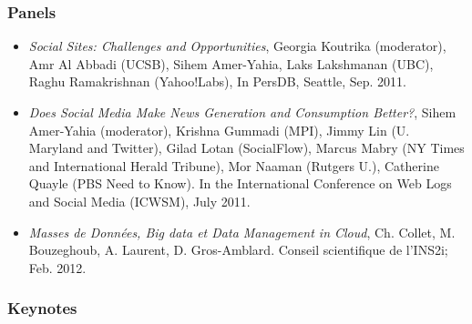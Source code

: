 \subsubsection*{Panels}

\begin{itemize}

\item \emph{Social Sites: Challenges and Opportunities}, Georgia Koutrika (moderator), Amr Al Abbadi (UCSB), Sihem Amer-Yahia, Laks Lakshmanan
  (UBC), Raghu Ramakrishnan (Yahoo!Labs), In PersDB, Seattle, Sep. 2011.

\item \emph{Does Social Media Make News Generation and Consumption Better?}, Sihem Amer-Yahia (moderator), Krishna Gummadi (MPI), Jimmy Lin
  (U. Maryland and Twitter), Gilad Lotan (SocialFlow), Marcus Mabry (NY Times and International Herald Tribune), Mor Naaman (Rutgers
  U.), Catherine Quayle (PBS Need to Know). In the International  Conference on Web Logs and Social Media (ICWSM), July 2011.




\item \emph{Masses de Donn{\'e}es, Big data et Data Management in Cloud}, Ch. Collet, M. Bouzeghoub, A. Laurent, D. Gros-Amblard. Conseil scientifique de l'INS2i; Feb. 2012. 

\end{itemize}

\subsubsection*{Keynotes}

